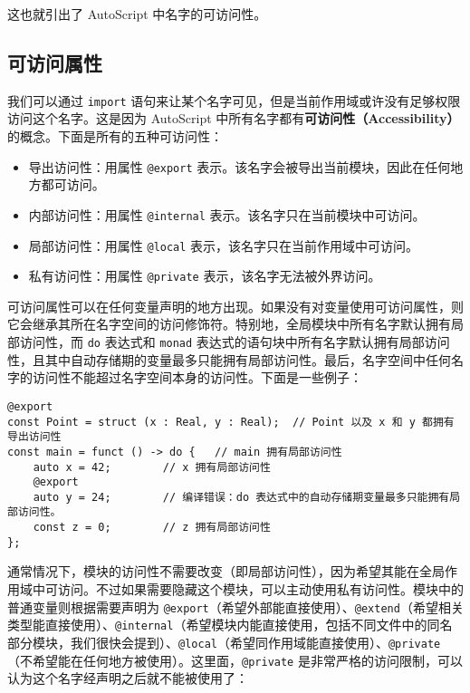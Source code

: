 这也就引出了 AutoScript 中名字的可访问性。

\subsection{可访问属性}

我们可以通过 \lstinline!import! 语句来让某个名字可见，但是当前作用域或许没有足够权限访问这个名字。这是因为 AutoScript 中所有名字都有\textbf{可访问性（Accessibility）}的概念。下面是所有的五种可访问性：

\begin{itemize}
	\item 导出访问性：用属性 \lstinline!@export! 表示。该名字会被导出当前模块，因此在任何地方都可访问。
	\item 内部访问性：用属性 \lstinline!@internal! 表示。该名字只在当前模块中可访问。
	\item 局部访问性：用属性 \lstinline!@local! 表示，该名字只在当前作用域中可访问。
	\item 私有访问性：用属性 \lstinline!@private! 表示，该名字无法被外界访问。
\end{itemize}

可访问属性可以在任何变量声明的地方出现。如果没有对变量使用可访问属性，则它会继承其所在名字空间的访问修饰符。特别地，全局模块中所有名字默认拥有局部访问性，而 \lstinline!do! 表达式和 \lstinline!monad! 表达式的语句块中所有名字默认拥有局部访问性，且其中自动存储期的变量最多只能拥有局部访问性。最后，名字空间中任何名字的访问性不能超过名字空间本身的访问性。下面是一些例子：

\begin{lstlisting}
@export 
const Point = struct (x : Real, y : Real);	// Point 以及 x 和 y 都拥有导出访问性
const main = funct () -> do {	// main 拥有局部访问性
	auto x = 42;		// x 拥有局部访问性
	@export 
	auto y = 24;		// 编译错误：do 表达式中的自动存储期变量最多只能拥有局部访问性。
	const z = 0;		// z 拥有局部访问性
};
\end{lstlisting}

通常情况下，模块的访问性不需要改变（即局部访问性），因为希望其能在全局作用域中可访问。不过如果需要隐藏这个模块，可以主动使用私有访问性。模块中的普通变量则根据需要声明为 \lstinline!@export!（希望外部能直接使用）、\lstinline!@extend!（希望相关类型能直接使用）、\lstinline!@internal!（希望模块内能直接使用，包括不同文件中的同名部分模块，我们很快会提到）、\lstinline!@local!（希望同作用域能直接使用）、\lstinline!@private!（不希望能在任何地方被使用）。这里面，\lstinline!@private! 是非常严格的访问限制，可以认为这个名字经声明之后就不能被使用了：

